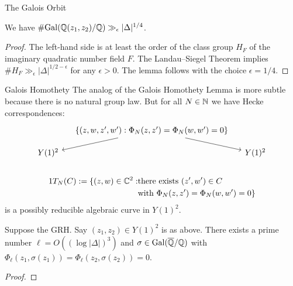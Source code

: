 \documentclass{beamer}
\begin{document}
\begin{frame}{The Galois Orbit}
  \begin{lemma}
    We have
      $\# \mathrm{Gal}({\mathbb{Q}}(z_1,z_2)/{\mathbb{Q}}) \gg_\epsilon
      |\Delta|^{1/4}$.
  \end{lemma}
  \begin{proof}
    The left-hand side is at least the order of the class group $H_F$
    of the imaginary quadratic number field $F$. The Landau--Siegel Theorem
    implies $\# H_F \gg_\epsilon |\Delta|^{1/2-\epsilon}$ for any $\epsilon>0$. 
    The lemma follows with the choice $\epsilon =1/4$. 
  \end{proof}

\end{frame}
\begin{frame}{Galois Homothety}
  The analog of the Galois Homothety Lemma is more subtle because
  there is no natural group law.
  But for all $N\in{\mathbb{N}}$
  we have \alert{Hecke correspondences}:
  \begin{equation*}
    \begin{tikzcd}[ampersand replacement=\&,column sep=small, row sep=small] 
      \& \{(z,w,z',w') : \Phi_N(z,z')=\Phi_N(w,w')=0\} \arrow{ddl}[swap]{} \arrow{ddr}{} \&\\
      \&  \&\\[-2ex]
      Y(1)^2  \& \& Y(1)^2 \\
    \end{tikzcd}
  \end{equation*}
  
  \begin{definition}
    \begin{alignat*}1
      T_N(C) := \{(z,w) \in\IC^2 : &\text{there exists $(z',w')\in C$}\\
      &\text{with $\Phi_N(z,z')=\Phi_N(w,w')=0$}\}
    \end{alignat*}
    is a possibly reducible algebraic curve in $Y(1)^2$. 
  \end{definition}
\end{frame}

\begin{frame}
  \begin{lemma}
    Suppose the \alert{GRH}.
    Say $(z_1,z_2)\in Y(1)^2$ is as above.
    There exists a prime number $\ell=O((\log
    |\Delta|)^3)$ and $\sigma\in \mathrm{Gal}({\overline{\mathbb{Q}}}/{\mathbb{Q}})$
    with $\Phi_\ell(z_1,\sigma(z_1))=\Phi_\ell(z_2,\sigma(z_2))=0$. 
  \end{lemma}
  \begin{proof}
    \vspace{4cm}
  \end{proof}
\end{frame}
\end{document}
